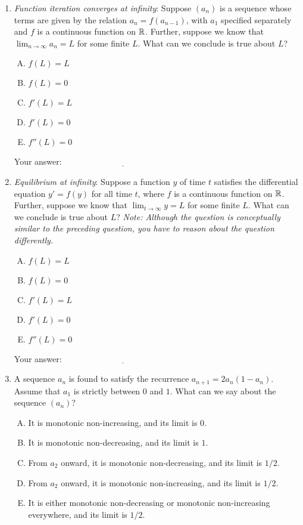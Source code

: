 \documentclass[10pt]{amsart}
\begin{document}
\begin{enumerate}
\item {\em Function iteration converges at infinity}: Suppose $(a_n)$
  is a sequence whose terms are given by the relation $a_n =
  f(a_{n-1})$, with $a_1$ specified separately and $f$ is a continuous
  function on $\mathbb{R}$. Further, suppose we know that $\lim_{n \to \infty}
  a_n = L$ for some finite $L$. What can we conclude is true about
  $L$?

  \begin{enumerate}[(A)]
  \item $f(L) = L$
  \item $f(L) = 0$
  \item $f'(L) = L$
  \item $f'(L) = 0$
  \item $f''(L) = 0$
  \end{enumerate}

  \vspace{0.1in}
  Your answer: $\underline{\qquad\qquad\qquad\qquad\qquad\qquad\qquad}$
  \vspace{0.15in}

\item {\em Equilibrium at infinity}: Suppose a function $y$ of time
  $t$ satisfies the differential equation $y' = f(y)$ for all time
  $t$, where $f$ is a continuous function on $\mathbb{R}$. Further, suppose we
  know that $\lim_{t \to \infty} y = L$ for some finite $L$. What can
  we conclude is true about $L$?  {\em Note: Although the question is
  conceptually similar to the preceding question, you have to reason
  about the question differently.}
  \begin{enumerate}[(A)]
  \item $f(L) = L$
  \item $f(L) = 0$
  \item $f'(L) = L$
  \item $f'(L) = 0$
  \item $f''(L) = 0$
  \end{enumerate}

  \vspace{0.1in}
  Your answer: $\underline{\qquad\qquad\qquad\qquad\qquad\qquad\qquad}$
  \vspace{0.15in}

\item A sequence $a_n$ is found to satisfy the recurrence $a_{n+1} =
  2a_n(1 - a_n)$. Assume that $a_1$ is strictly between $0$ and
  $1$. What can we say about the sequence $(a_n)$?
  \begin{enumerate}[(A)]
  \item It is monotonic non-increasing, and its limit is $0$.
  \item It is monotonic non-decreasing, and its limit is $1$.
  \item From $a_2$ onward, it is monotonic non-decreasing, and its
    limit is $1/2$.
  \item From $a_2$ onward, it is monotonic non-increasing, and its
    limit is $1/2$.
  \item It is either monotonic non-decreasing or monotonic
    non-increasing everywhere, and its limit is $1/2$.
  \end{enumerate}


\end{enumerate}
\end{document}

